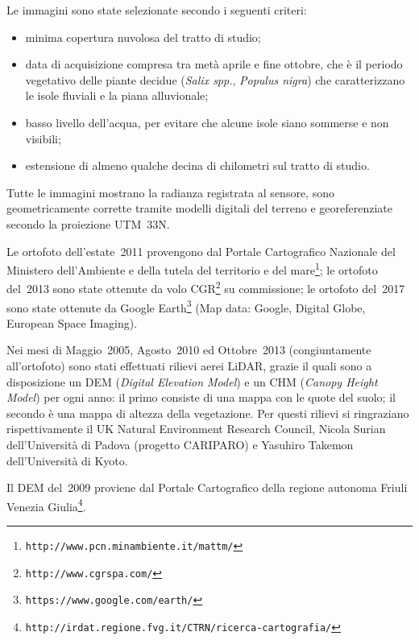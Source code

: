 %
Le immagini sono state selezionate secondo i seguenti criteri:
%
\begin{itemize}
	\item minima copertura nuvolosa del tratto di studio;
	\item data di acquisizione compresa tra metà aprile e fine ottobre, che è il periodo vegetativo delle piante decidue (\emph{Salix spp.}, \emph{Populus nigra}) che caratterizzano le isole fluviali e la piana alluvionale;
	\item basso livello dell'acqua, per evitare che alcune isole siano sommerse e non visibili;
	\item estensione di almeno qualche decina di chilometri sul tratto di studio.
\end{itemize}
%
Tutte le immagini mostrano la radianza registrata al sensore, sono geometricamente corrette tramite modelli digitali del terreno e georeferenziate secondo la proiezione UTM~33N.

Le ortofoto dell'estate~2011 provengono dal
Portale Cartografico Nazionale del Ministero dell'Ambiente e della tutela del territorio e del mare\footnote{\texttt{http://www.pcn.minambiente.it/mattm/}};
le ortofoto del~2013 sono state ottenute da volo
CGR\footnote{\texttt{http://www.cgrspa.com/}} su commissione; 
le ortofoto del~2017 sono state ottenute da
Google Earth\footnote{\texttt{https://www.google.com/earth/}} (Map data: Google, Digital Globe, European Space Imaging).

Nei mesi di Maggio~2005, Agosto~2010 ed Ottobre~2013 (congiuntamente all'ortofoto) sono stati effettuati rilievi aerei LiDAR, grazie il quali sono a disposizione un DEM (\emph{Digital Elevation Model}) e un CHM (\emph{Canopy Height Model}) per ogni anno: il primo consiste di una mappa con le quote del suolo; il secondo è una mappa di altezza della vegetazione.
Per questi rilievi si ringraziano rispettivamente il UK Natural Environment Research Council, Nicola Surian dell'Università di Padova (progetto CARIPARO) e Yasuhiro Takemon dell'Università di Kyoto.

Il DEM del~2009 proviene dal
Portale Cartografico della regione autonoma Friuli Venezia Giulia\footnote{\texttt{http://irdat.regione.fvg.it/CTRN/ricerca-cartografia/}}.

